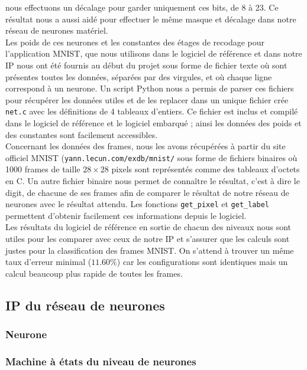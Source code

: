 nous effectuons un décalage pour garder uniquement ces bits, de 8 à 23. Ce
résultat nous a aussi aidé pour effectuer le même masque et décalage dans notre
réseau de neurones matériel. \\
Les poids de ces neurones et les constantes des étages de recodage
pour l'application MNIST, que nous utilisons dans
le logiciel de référence et dans notre IP nous ont été fournis au début du projet
sous forme de fichier texte où sont présentes toutes les données, séparées par
des virgules, et où chaque ligne correspond à un neurone. Un script Python nous
a permis de parser ces fichiers pour récupérer les données utiles et de les
replacer dans un unique fichier crée \texttt{net.c} avec les définitions de
4 tableaux d'entiers. Ce fichier est inclus et compilé dans le logiciel de référence et
le logiciel embarqué ; ainsi les données des poids et des constantes sont
facilement accessibles. \\
Concernant les données des frames, nous les avons récupérées à partir du site
officiel MNIST (\texttt{yann.lecun.com/exdb/mnist/} sous forme de fichiers
binaires où 1000 frames de taille $28 \times 28$ pixels sont représentés comme
des tableaux d'octets en C. Un autre fichier binaire nous permet de connaître
le résultat, c'est à dire le digit, de chacune de ses frames afin de comparer le
résultat de notre réseau de neurones avec le résultat attendu.
Les fonctions \texttt{get\_pixel} et \texttt{get\_label} permettent d'obtenir
facilement ces informations depuis le logiciel. \\
Les résultats du logiciel de référence en sortie de chacun des niveaux nous
sont utiles pour les comparer avec ceux de notre IP et s'assurer que les calculs
sont justes pour la classification des frames MNIST. On s'attend à trouver
un même taux d'erreur minimal ($11.60\%$) car les configurations sont identiques
mais un calcul beaucoup plus rapide de toutes les frames.

\subsection{IP du réseau de neurones}
\subsubsection{Neurone}
\subsubsection{Machine à états du niveau de neurones}
